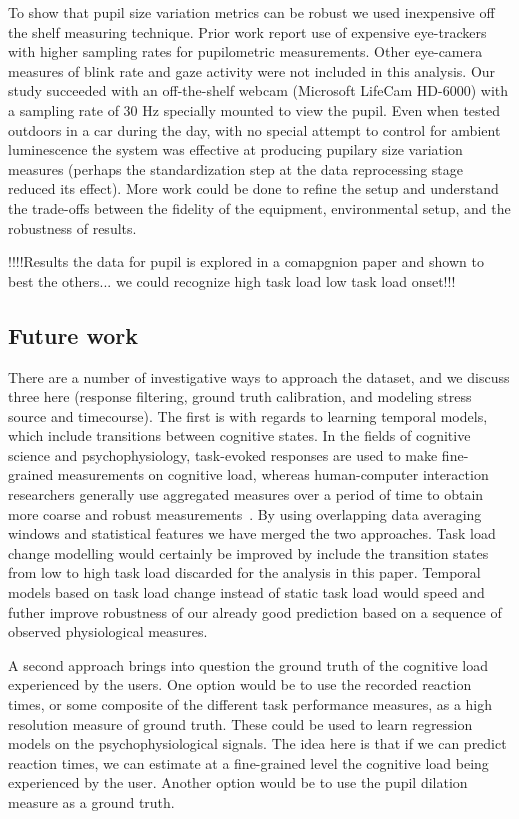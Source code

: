 To show that pupil size variation metrics can be robust we used inexpensive off the shelf measuring technique. Prior work report use of expensive eye-trackers with higher sampling rates for pupilometric measurements. Other eye-camera measures of blink rate and gaze activity were not included in this analysis. Our study succeeded with an off-the-shelf webcam (Microsoft LifeCam HD-6000) with a sampling rate of 30 Hz specially mounted to view the pupil.  Even when tested outdoors in a car during the day,  with no special attempt to control for ambient luminescence the system was effective at producing pupilary size variation measures (perhaps the standardization step at the data reprocessing stage reduced its effect). More work could be done to refine the setup and understand the trade-offs between the fidelity of the equipment, environmental setup, and the robustness of results. 

!!!!Results the data for pupil is explored in a comapgnion paper and shown to best the others... we could recognize high task load low task load onset!!!

\subsection{Future work}
There are a number of investigative ways to approach the dataset, and we discuss three here (response filtering, ground truth calibration, and modeling stress source and timecourse). The first is with regards to learning temporal models, which include transitions between cognitive states. In the fields of cognitive science and psychophysiology, task-evoked responses are used to make fine-grained measurements on cognitive load, whereas human-computer interaction researchers generally use aggregated measures over a period of time to obtain more coarse and robust measurements~\cite{klingner2008}. By using overlapping  data averaging windows and statistical features we have merged the two approaches. Task load change modelling would certainly be improved by include the transition states from low to high task load discarded for the analysis in this paper. Temporal models based on task load change instead of static task load would speed and futher improve robustness of our already good prediction based on a sequence of observed physiological measures.  

A second approach brings into question the ground truth of the cognitive load experienced by the users. One option would be to use the recorded reaction times, or some composite of the different task performance measures, as a high resolution measure of ground truth. These could be used to learn regression models on the psychophysiological signals. The idea here is that if we can predict reaction times, we can estimate at a fine-grained level the cognitive load being experienced by the user. Another option would be to use the pupil dilation measure as a ground truth.

